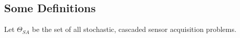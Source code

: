 \subsection{Some Definitions}
Let $\Theta_{SA}$ be the set of all stochastic, cascaded sensor acquisition problems.
%
	
	
